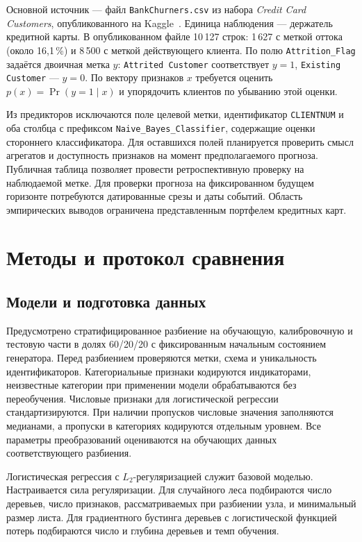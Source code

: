 \documentclass{misisarticle}
\begin{document}
Основной источник — файл \texttt{BankChurners.csv} из набора \textit{Credit Card Customers}, опубликованного на Kaggle~\cite{kaggle}. Единица наблюдения — держатель кредитной карты. В опубликованном файле 10\,127 строк: 1\,627 с меткой оттока (около 16{,}1\,\%) и 8\,500 с меткой действующего клиента. По полю \texttt{Attrition\_Flag} задаётся двоичная метка $y$: \texttt{Attrited Customer} соответствует $y=1$, \texttt{Existing Customer} — $y=0$. По вектору признаков $x$ требуется оценить $p(x)=\Pr(y=1\mid x)$ и упорядочить клиентов по убыванию этой оценки.

Из предикторов исключаются поле целевой метки, идентификатор \texttt{CLIENTNUM} и оба столбца с префиксом \texttt{Naive\_Bayes\_Classifier}, содержащие оценки стороннего классификатора. Для оставшихся полей планируется проверить смысл агрегатов и доступность признаков на момент предполагаемого прогноза. Публичная таблица позволяет провести ретроспективную проверку на наблюдаемой метке. Для проверки прогноза на фиксированном будущем горизонте потребуются датированные срезы и даты событий. Область эмпирических выводов ограничена представленным портфелем кредитных карт.

\section{Методы и протокол сравнения}

\subsection{Модели и подготовка данных}

Предусмотрено стратифицированное разбиение на обучающую, калибровочную и тестовую части в долях 60/20/20 с фиксированным начальным состоянием генератора. Перед разбиением проверяются метки, схема и уникальность идентификаторов. Категориальные признаки кодируются индикаторами, неизвестные категории при применении модели обрабатываются без переобучения. Числовые признаки для логистической регрессии стандартизируются. При наличии пропусков числовые значения заполняются медианами, а пропуски в категориях кодируются отдельным уровнем. Все параметры преобразований оцениваются на обучающих данных соответствующего разбиения.

Логистическая регрессия с $L_2$-регуляризацией служит базовой моделью. Настраивается сила регуляризации. Для случайного леса подбираются число деревьев, число признаков, рассматриваемых при разбиении узла, и минимальный размер листа. Для градиентного бустинга деревьев с логистической функцией потерь подбираются число и глубина деревьев и темп обучения.
\end{document}

